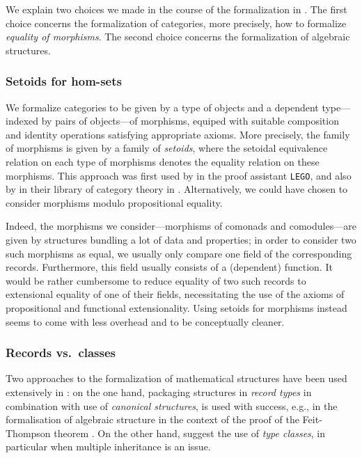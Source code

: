 \documentclass[conference,10pt]{IEEEtran}
\begin{document}
We explain two choices we made in the course of the formalization in \coq. The first choice concerns
the formalization of categories, more precisely, how to formalize \emph{equality of morphisms}.
The second choice concerns the formalization of algebraic structures.

\subsubsection{Setoids for hom-sets}
We formalize categories to be given by a type of objects and a dependent type---indexed by pairs of objects---of morphisms,
equiped with suitable composition and identity operations satisfying appropriate axioms.
More precisely, the family of morphisms is given by a family of \emph{setoids}, where the setoidal equivalence relation on each
type of morphisms denotes the equality relation on these morphisms. This approach was first used by
\textcite{aczel_galois} in the proof assistant \texttt{LEGO}, and also by \textcite{concat}  in their library
of category theory in \coq.
Alternatively, we could have chosen to consider morphisms modulo propositional equality.

Indeed, the morphisms we consider---morphisms of comonads and comodules---are given by structures
bundling a lot of data and properties; in order to consider two such morphisms as equal, we usually only compare one field of the 
corresponding records. Furthermore, this field usually consists of a (dependent) function.
It would be rather cumbersome to reduce equality of two such records to extensional equality of one of their fields, 
necessitating the use of the axioms of propositional and functional extensionality.
Using setoids for morphisms instead seems to come with less overhead and to be conceptually cleaner.



\subsubsection{Records vs.\ classes}
Two approaches to the formalization of mathematical structures have been used extensively in \coq: on the one hand, packaging structures
in \emph{record types}  in combination with use of \emph{canonical structures}, is used with success, e.g., in 
the formalisation of algebraic structure in the context of the proof of the Feit-Thompson theorem \parencite{DBLP:conf/tphol/GarillotGMR09}.
On the other hand, \textcite{DBLP:journals/mscs/SpittersW11} suggest the use of \emph{type classes}, in particular when multiple inheritance
is an issue.
\end{document}
